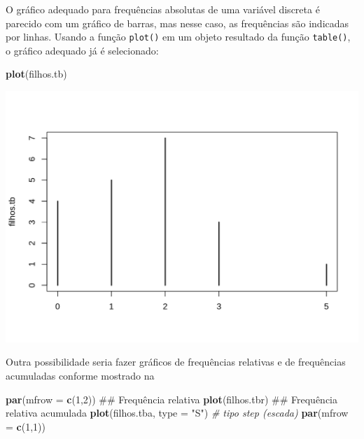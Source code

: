 \documentclass[10pt,a4paper]{book}
\newenvironment{Shaded}{\begin{snugshade}}{\end{snugshade}}
\newcommand{\KeywordTok}[1]{\textcolor[rgb]{0.13,0.29,0.53}{\textbf{#1}}}
\newcommand{\DataTypeTok}[1]{\textcolor[rgb]{0.13,0.29,0.53}{#1}}
\newcommand{\DecValTok}[1]{\textcolor[rgb]{0.00,0.00,0.81}{#1}}
\newcommand{\StringTok}[1]{\textcolor[rgb]{0.31,0.60,0.02}{#1}}
\newcommand{\CommentTok}[1]{\textcolor[rgb]{0.56,0.35,0.01}{\textit{#1}}}
\newcommand{\NormalTok}[1]{#1}
\begin{document}
O gráfico adequado para frequências absolutas de uma variável discreta é
parecido com um gráfico de barras, mas nesse caso, as frequências são
indicadas por linhas. Usando a função \texttt{plot()} em um objeto
resultado da função \texttt{table()}, o gráfico adequado já é
selecionado:

\begin{Shaded}
\begin{Highlighting}[]
\KeywordTok{plot}\NormalTok{(filhos.tb)}
\end{Highlighting}
\end{Shaded}

\begin{center}\includegraphics{figures/unnamed-chunk-300-1} \end{center}

Outra possibilidade seria fazer gráficos de frequências relativas e de
frequências acumuladas conforme mostrado na

\begin{Shaded}
\begin{Highlighting}[]
\KeywordTok{par}\NormalTok{(}\DataTypeTok{mfrow =} \KeywordTok{c}\NormalTok{(}\DecValTok{1}\NormalTok{,}\DecValTok{2}\NormalTok{))}
\NormalTok{## Frequência relativa}
\KeywordTok{plot}\NormalTok{(filhos.tbr)}
\NormalTok{## Frequência relativa acumulada}
\KeywordTok{plot}\NormalTok{(filhos.tba, }\DataTypeTok{type =} \StringTok{"S"}\NormalTok{) }\CommentTok{# tipo step (escada)}
\KeywordTok{par}\NormalTok{(}\DataTypeTok{mfrow =} \KeywordTok{c}\NormalTok{(}\DecValTok{1}\NormalTok{,}\DecValTok{1}\NormalTok{))}
\end{Highlighting}
\end{Shaded}
\end{document}
